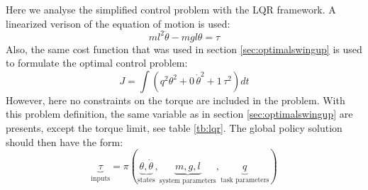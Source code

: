 Here we analyse the simplified control problem with the LQR framework. A linearized verison of the equation of motion is used:
\begin{equation}
ml^2 \ddot{\theta} - mgl \theta = \tau
\label{eq:pendulum_dynamics}
\end{equation}
Also, the same cost function that was used in section \ref{sec:optimalswingup} is used to formulate the optimal control problem:
\begin{equation}
J = \int{( q^2 \theta^2 + 0 \, \dot{\theta}^2 + 1 \, \tau^2 ) dt }
\label{eq:pendulum_cost}
\end{equation}
However, here no constraints on the torque are included in the problem. With this problem definition, the same variable as in section \ref{sec:optimalswingup} are presents, except the torque limit, see table \ref{tb:lqr}. The global policy solution should then have the form:
\begin{equation}
\underbrace{\tau}_{\text{inputs}}
=
\pi \left(
\underbrace{ \theta, \dot{\theta} }_{\text{states}},
\underbrace{ m , g , l }_{\text{system parameters}},
\underbrace{ q }_{\text{task parameters}}
\right)
\label{eq:lqr_policy}
\end{equation}
